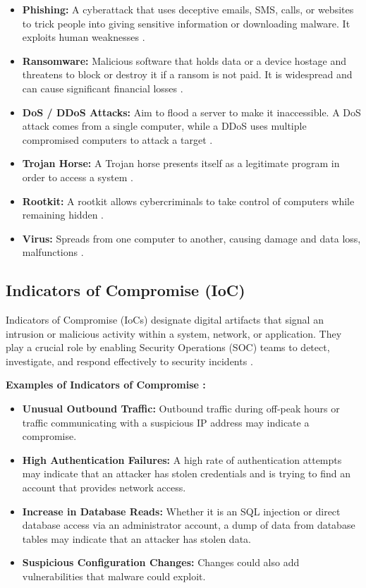 \begin{itemize}
    \item \textbf{Phishing:} A cyberattack that uses deceptive emails, SMS, calls, or websites to trick people into giving sensitive information or downloading malware. It exploits human weaknesses \cite{ref9}.
    \item \textbf{Ransomware:} Malicious software that holds data or a device hostage and threatens to block or destroy it if a ransom is not paid. It is widespread and can cause significant financial losses \cite{ref10}.
    \item \textbf{DoS / DDoS Attacks:} Aim to flood a server to make it inaccessible. A DoS attack comes from a single computer, while a DDoS uses multiple compromised computers to attack a target \cite{ref11}.
    \item \textbf{Trojan Horse:} A Trojan horse presents itself as a legitimate program in order to access a system \cite{ref12}.
    \item \textbf{Rootkit:} A rootkit allows cybercriminals to take control of computers while remaining hidden \cite{ref13}.
    \item \textbf{Virus:} Spreads from one computer to another, causing damage and data loss, malfunctions \cite{ref14}.
\end{itemize}

\subsection{Indicators of Compromise (IoC)}
\label{subsec:ioc}

Indicators of Compromise (IoCs) designate digital artifacts that signal an intrusion or malicious activity within a system, network, or application. They play a crucial role by enabling Security Operations (SOC) teams to detect, investigate, and respond effectively to security incidents \cite{ref15}.

\textbf{Examples of Indicators of Compromise \cite{ref16}:}

\begin{itemize}
    \item \textbf{Unusual Outbound Traffic:} Outbound traffic during off-peak hours or traffic communicating with a suspicious IP address may indicate a compromise.
    \item \textbf{High Authentication Failures:} A high rate of authentication attempts may indicate that an attacker has stolen credentials and is trying to find an account that provides network access.
    \item \textbf{Increase in Database Reads:} Whether it is an SQL injection or direct database access via an administrator account, a dump of data from database tables may indicate that an attacker has stolen data.
    \item \textbf{Suspicious Configuration Changes:} Changes could also add vulnerabilities that malware could exploit.
\end{itemize}

